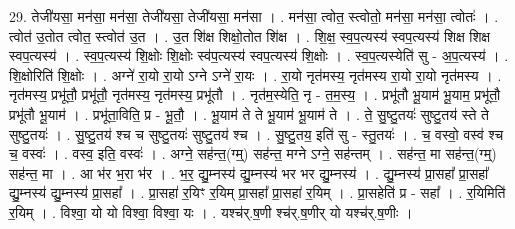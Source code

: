 \documentclass[17pt]{extarticle}
\begin{document}
29. तेजी॑यसा॒ मन॑सा॒ मन॑सा॒ तेजी॑यसा॒ तेजी॑यसा॒ मन॑सा । . मन॑सा॒ त्वोत॒ स्त्वोतो॒ मन॑सा॒ मन॑सा॒ त्वोतः॑ । . त्वोत॑ उ॒तोत त्वोत॒ स्त्वोत॑ उ॒त । . उ॒त शि॑क्ष शिक्षो॒तोत शि॑क्ष । . शि॒क्ष॒ स्व॒प॒त्यस्य॑ स्वप॒त्यस्य॑ शिक्ष शिक्ष स्वप॒त्यस्य॑ । . स्व॒प॒त्यस्य॑ शि॒क्षोः शि॒क्षोः स्व॑प॒त्यस्य॑ स्वप॒त्यस्य॑ शि॒क्षोः । . स्व॒प॒त्यस्येति॑ सु - अ॒प॒त्यस्य॑ । . शि॒क्षोरिति॑ शि॒क्षोः । . अग्ने॑ रा॒यो रा॒यो ऽग्ने ऽग्ने॑ रा॒यः । . रा॒यो नृत॑मस्य॒ नृत॑मस्य रा॒यो रा॒यो नृत॑मस्य । . नृत॑मस्य॒ प्रभू॑तौ॒ प्रभू॑तौ॒ नृत॑मस्य॒ नृत॑मस्य॒ प्रभू॑तौ । . नृत॑म॒स्येति॒ नृ - त॒म॒स्य॒ । . प्रभू॑तौ भू॒याम॑ भू॒याम॒ प्रभू॑तौ॒ प्रभू॑तौ भू॒याम॑ । . प्रभू॑ता॒विति॒ प्र - भू॒तौ॒ । . भू॒याम॑ ते ते भू॒याम॑ भू॒याम॑ ते । . ते॒ सु॒ष्टु॒तयः॑ सुष्टु॒तय॑ स्ते ते सुष्टु॒तयः॑ । . सु॒ष्टु॒तय॑ श्च च सुष्टु॒तयः॑ सुष्टु॒तय॑ श्च । . सु॒ष्टु॒तय॒ इति॑ सु - स्तु॒तयः॑ । . च॒ वस्वो॒ वस्व॑ श्च च॒ वस्वः॑ । . वस्व॒ इति॒ वस्वः॑ । . अग्ने॒ सह॑न्त॒(ग्म्॒) सह॑न्त॒ मग्ने ऽग्ने॒ सह॑न्तम् । . सह॑न्त॒ मा सह॑न्त॒(ग्म्॒) सह॑न्त॒ मा । . आ भ॑र भ॒रा भ॑र । . भ॒र॒ द्यु॒म्नस्य॑ द्यु॒म्नस्य॑ भर भर द्यु॒म्नस्य॑ । . द्यु॒म्नस्य॑ प्रा॒सहा᳚ प्रा॒सहा᳚ द्यु॒म्नस्य॑ द्यु॒म्नस्य॑ प्रा॒सहा᳚ । . प्रा॒सहा॑ र॒यिꣳ र॒यिम् प्रा॒सहा᳚ प्रा॒सहा॑ र॒यिम् । . प्रा॒सहेति॑ प्र - सहा᳚ । . र॒यिमिति॑ र॒यिम् । . विश्वा॒ यो यो विश्वा॒ विश्वा॒ यः । . यश्च॑र्.ष॒णी श्च॑र्.ष॒णीर् यो यश्च॑र्.ष॒णीः । \newline
\end{document}
